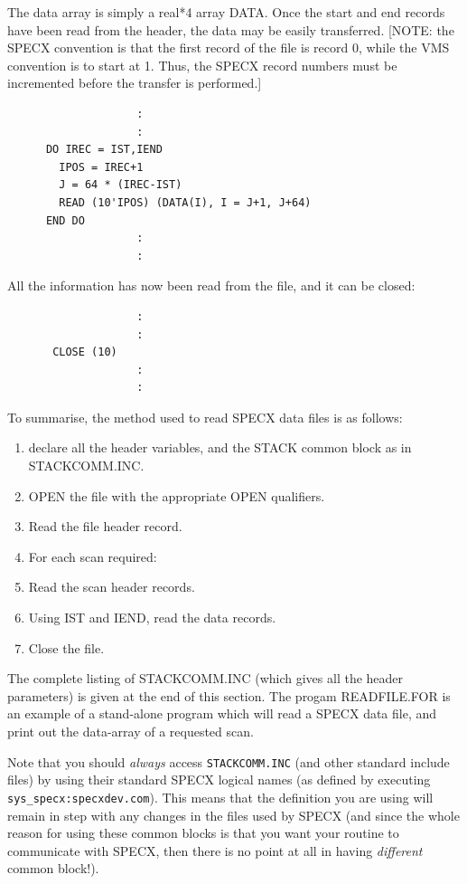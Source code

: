 \documentclass[11pt,twoside]{report}
\begin{document}
The data array is simply a real*4 array DATA. Once the start and end
records have been read from the header, the data may be easily
transferred. [NOTE: the SPECX convention is that the first record of
the file is record 0, while the VMS convention is to start at 1. Thus,
the SPECX record numbers must be incremented before the transfer is
performed.]

\begin{verbatim}
                    :
                    :
      DO IREC = IST,IEND
        IPOS = IREC+1
        J = 64 * (IREC-IST)
        READ (10'IPOS) (DATA(I), I = J+1, J+64)
      END DO
                    :
                    :
\end{verbatim}

All the information has now been read from the file, and it can be
closed:

\begin{verbatim}
                    :
                    :
       CLOSE (10)
                    :
                    :
\end{verbatim}

To summarise, the method used to read SPECX data files is as follows:
\begin{enumerate}
\item declare all the header variables, and the STACK common
       block as in STACKCOMM.INC.
\item OPEN the file with the appropriate OPEN qualifiers.
\item Read the file header record.
\item For each scan required:
\item Read the scan header records.
\item Using IST and IEND, read the data records.
\item Close the file.
\end{enumerate}


The complete listing of STACKCOMM.INC (which gives all the header
parameters) is given at the end of this section. The progam READFILE.FOR is an
example of a stand-alone program which will read a SPECX data file,
and print out the data-array of a requested scan.

Note that you should {\em always} access \verb+STACKCOMM.INC+ (and other
standard include files) by using their standard SPECX logical names (as
defined by executing \verb+sys_specx:specxdev.com+). This means that the
definition you are using will remain in step with any changes in the files
used by SPECX (and since the whole reason for using these common blocks
is that you want your routine to communicate with SPECX, then there is no
point at all in having {\em different} common block!).
\end{document}
